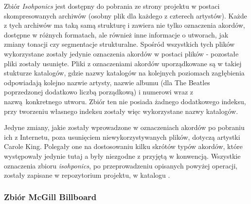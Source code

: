 Zbiór \emph{Isohponics} jest dostępny do pobrania ze strony projektu w postaci skompresowanych
archiwów  (osobny plik dla każdego z czterech artystów). Każde z tych archiwów ma taką
samą strukturę i zawiera nie tylko oznaczenia akordów, dostępne w różnych formatach, ale również
inne informacje o utworach, jak zmiany tonacji czy segmentacje strukturalne. Spośród wszystkich tych
plików wykorzystane zostały jedynie oznaczenia akordów w postaci plików  - pozostałe pliki
zostały usunięte. Pliki z oznaczeniami akordów uporządkowane są w takiej stukturze katalogów, gdzie
nazwy katalogów na kolejnych poziomach zagłębienia odpowiadają kolejno nazwie artysty, nazwie albumu
(dla The Beatles poprzedzonej dodatkowo liczbą porządkową) i numerowi wraz z nazwą konkretnego
utworu. Zbiór ten nie posiada żadnego dodatkowego indeksu, przy tworzeniu własnego indeksu zostały
więc wykorzystane nazwy katalogów.

Jedyne zmiany, jakie zostały wprowadzone w oznaczeniach akordów po pobraniu ich z Internetu, poza
usunięciem niewykorzystywanych plików, dotyczą artystki Carole King. Polegały one na dostosowaniu
kilku skrótów typów akordów, które występowały jedynie tutaj a były niezgodne z przyjętą w
\cite{harte_towards_nodate} konwencją. Wszystkie oznaczenia zbioru \emph{isohponics}, po
przeprowadzeniu opisanych powyżej operacji, zostały zapisane w repozytorium projektu, w katalogu
.


\subsubsection{Zbiór McGill Billboard}

